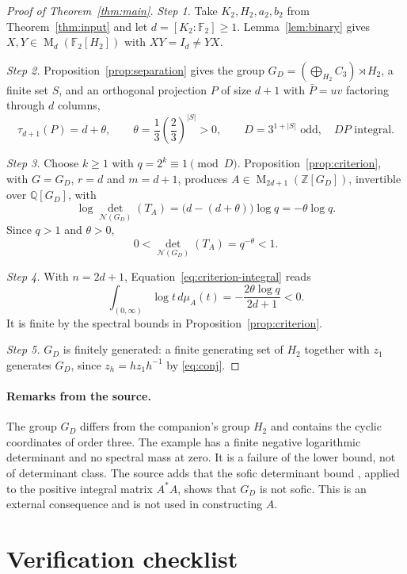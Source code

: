 \documentclass[11pt]{article}
\theoremstyle{remark}
\numberwithin{equation}{section}
\newcommand{\F}{\mathbb F}
\newcommand{\Z}{\mathbb Z}
\newcommand{\Q}{\mathbb Q}
\newcommand{\Mat}{\operatorname{M}}
\newcommand{\N}{\mathcal N}
\begin{document}
\begin{proof}[Proof of Theorem~\ref{thm:main}]
\emph{Step 1.} Take $K_2,H_2,a_2,b_2$ from Theorem~\ref{thm:input} and let $d=[K_2:\F_2]\ge1$. Lemma~\ref{lem:binary} gives $X,Y\in\Mat_d(\F_2[H_2])$ with $XY=I_d\ne YX$.

\emph{Step 2.} Proposition~\ref{prop:separation} gives the group
$G_D=(\bigoplus_{H_2}C_3)\rtimes H_2$, a finite set $S$, and an orthogonal projection $P$
of size $d+1$ with $\bar P=uv$ factoring through $d$ columns,
\[
 \tau_{d+1}(P)=d+\theta,\qquad\theta=\frac13\left(\frac23\right)^{|S|}>0,
 \qquad D=3^{1+|S|}\text{ odd},\quad DP\text{ integral}.
\]

\emph{Step 3.} Choose $k\ge1$ with $q=2^k\equiv1\pmod D$.
Proposition~\ref{prop:criterion}, with $G=G_D$, $r=d$ and $m=d+1$,
produces $A\in\Mat_{2d+1}(\Z[G_D])$, invertible over $\Q[G_D]$, with
\[
 \log\det_{\N(G_D)}(T_A)=\bigl(d-(d+\theta)\bigr)\log q=-\theta\log q.
\]
Since $q>1$ and $\theta>0$,
\begin{equation}\label{eq:final-det}
 0<\det_{\N(G_D)}(T_A)=q^{-\theta}<1.
\end{equation}

\emph{Step 4.} With $n=2d+1$, Equation~\eqref{eq:criterion-integral} reads
\begin{equation}\label{eq:final-integral}
 \int_{(0,\infty)}\log t\,d\mu_A(t)
 =-\frac{2\theta\log q}{2d+1}<0.
\end{equation}
It is finite by the spectral bounds in Proposition~\ref{prop:criterion}.

\emph{Step 5.} $G_D$ is finitely generated: a finite generating set of $H_2$ together with $z_1$ generates $G_D$, since $z_h=hz_1h^{-1}$ by \eqref{eq:conj}.
\end{proof}

\paragraph{Remarks from the source.} The group $G_D$ differs from the companion's group $H_2$ and contains the cyclic coordinates of order three. The example has a finite negative logarithmic determinant and no spectral mass at zero. It is a failure of the lower bound, not of determinant class. The source adds that the sofic determinant bound \cite[Theorem 5]{ElekSzabo2005}, applied to the positive integral matrix $A^*A$, shows that $G_D$ is not sofic. This is an external consequence and is not used in constructing $A$.

\section{Verification checklist}
\end{document}
